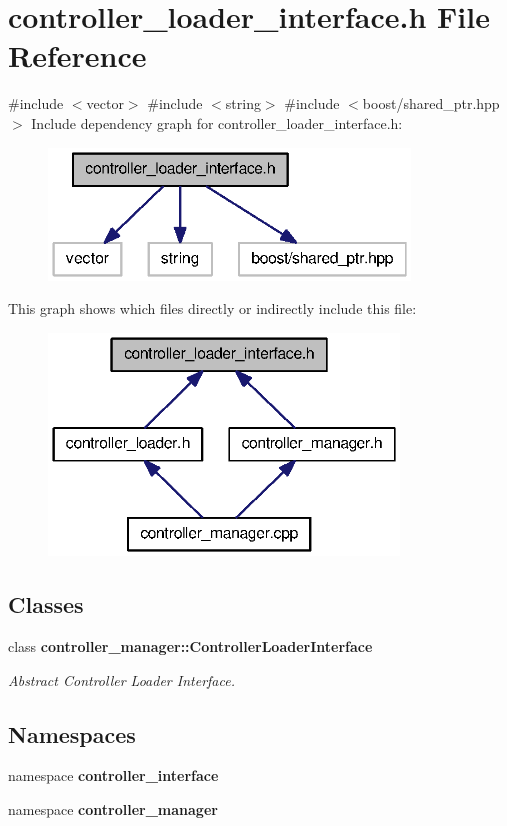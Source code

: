 \section{controller\-\_\-loader\-\_\-interface.\-h \-File \-Reference}
\label{controller__loader__interface_8h}
{\ttfamily \#include $<$vector$>$}\*
{\ttfamily \#include $<$string$>$}\*
{\ttfamily \#include $<$boost/shared\-\_\-ptr.\-hpp$>$}\*
\-Include dependency graph for controller\-\_\-loader\-\_\-interface.\-h\-:
\nopagebreak
\begin{figure}[H]
\begin{center}
\leavevmode
\includegraphics[width=272pt]{controller__loader__interface_8h__incl}
\end{center}
\end{figure}
\-This graph shows which files directly or indirectly include this file\-:
\nopagebreak
\begin{figure}[H]
\begin{center}
\leavevmode
\includegraphics[width=264pt]{controller__loader__interface_8h__dep__incl}
\end{center}
\end{figure}
\subsection*{\-Classes}
\begin{DoxyCompactItemize}
\item 
class {\bf controller\-\_\-manager\-::\-Controller\-Loader\-Interface}
\begin{DoxyCompactList}\small\item\em \-Abstract \-Controller \-Loader \-Interface. \end{DoxyCompactList}\end{DoxyCompactItemize}
\subsection*{\-Namespaces}
\begin{DoxyCompactItemize}
\item 
namespace {\bf controller\-\_\-interface}
\item 
namespace {\bf controller\-\_\-manager}
\end{DoxyCompactItemize}
